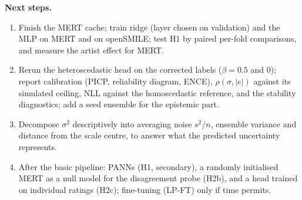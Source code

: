 \documentclass[conference]{IEEEtran}
\begin{document}
\textbf{Next steps.}
\begin{enumerate}
\item Finish the MERT cache; train ridge (layer chosen on validation) and the
MLP on MERT and on openSMILE; test H1 by paired per-fold comparisons, and
measure the artist effect for MERT.
\item Rerun the heteroscedastic head on the corrected labels ($\beta=0.5$ and
$0$); report calibration (PICP, reliability diagram, ENCE), $\rho(\sigma,|e|)$
against its simulated ceiling, NLL against the homoscedastic reference, and the
stability diagnostics; add a seed ensemble for the epistemic part.
\item Decompose $\sigma^2$ descriptively into averaging noise $s^2/n$,
ensemble variance and distance from the scale centre, to answer what the
predicted uncertainty represents.
\item After the basic pipeline: PANNs (H1, secondary), a randomly initialised
MERT as a null model for the disagreement probe (H2b), and a head trained on
individual ratings (H2c); fine-tuning (LP-FT) only if time permits.
\end{enumerate}



\end{document}
